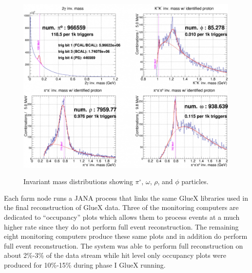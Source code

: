 \begin{figure}[tbp]
\begin{center}
\includegraphics[width=0.99\textwidth]{figures/online_monitoring_PID.png}
\label{fig:online_monitoring_PID}
\caption{Invariant mass distributions showing $\pi^\circ$, $\omega$, $\rho$, and $\phi$ particles.}   
\end{center}  
\end{figure}


Each farm node runs a JANA\cite{jana_v0_8_1b} process that links the same GlueX libraries used in the final reconstruction of GlueX data. Three of the monitoring computers are dedicated to ``occupancy'' plots which allows them to process events at a much higher rate since they do not perform full event reconstruction. The remaining eight monitoring computers produce these same plots and in addition do perform full event reconstruction. The system was able to perform full reconstruction on about 2\%-3\% of the data stream while hit level only occupancy plots were produced for 10\%-15\% during phase I GlueX running.


